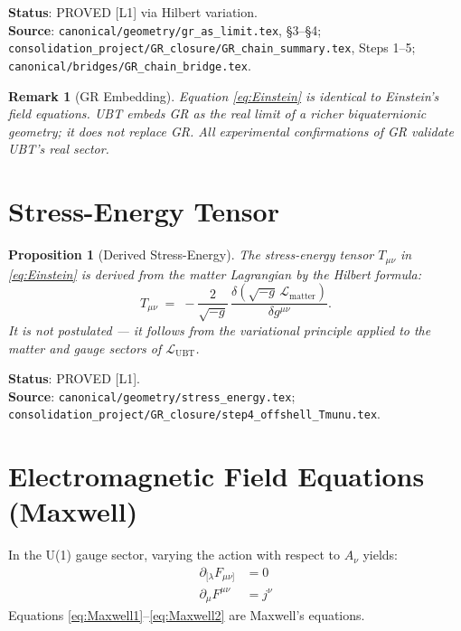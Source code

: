 \documentclass[11pt,a4paper]{article}
\newtheorem{proposition}{Proposition}
\newtheorem{remark}{Remark}
\begin{document}
\noindent\textbf{Status}: PROVED [L1] via Hilbert variation.\\
\noindent\textbf{Source}: \texttt{canonical/geometry/gr\_as\_limit.tex}, \S3--\S4;
\texttt{consolidation\_project/GR\_closure/GR\_chain\_summary.tex}, Steps 1--5;
\texttt{canonical/bridges/GR\_chain\_bridge.tex}.

\begin{remark}[GR Embedding]
Equation \eqref{eq:Einstein} is identical to Einstein's field equations.
UBT \emph{embeds} GR as the real limit of a richer biquaternionic geometry;
it does not replace GR. All experimental confirmations of GR validate UBT's
real sector.
\end{remark}

\section{Stress-Energy Tensor}

\begin{proposition}[Derived Stress-Energy]
The stress-energy tensor $T_{\mu\nu}$ in \eqref{eq:Einstein} is derived from
the matter Lagrangian by the Hilbert formula:
\begin{equation}
  T_{\mu\nu}
  \;=\;
  -\frac{2}{\sqrt{-g}}\,\frac{\delta(\sqrt{-g}\,\mathcal{L}_{\mathrm{matter}})}{\delta g^{\mu\nu}}.
\end{equation}
It is not postulated — it follows from the variational principle applied
to the matter and gauge sectors of $\mathcal{L}_{\mathrm{UBT}}$.
\end{proposition}

\noindent\textbf{Status}: PROVED [L1].\\
\noindent\textbf{Source}: \texttt{canonical/geometry/stress\_energy.tex};
\texttt{consolidation\_project/GR\_closure/step4\_offshell\_Tmunu.tex}.

\section{Electromagnetic Field Equations (Maxwell)}

In the U(1) gauge sector, varying the action with respect to $A_\nu$ yields:
\begin{align}
  \partial_{[\lambda}F_{\mu\nu]} &= 0 \label{eq:Maxwell1} \\
  \partial_\mu F^{\mu\nu} &= j^\nu \label{eq:Maxwell2}
\end{align}
Equations \eqref{eq:Maxwell1}--\eqref{eq:Maxwell2} are Maxwell's equations.
\end{document}
